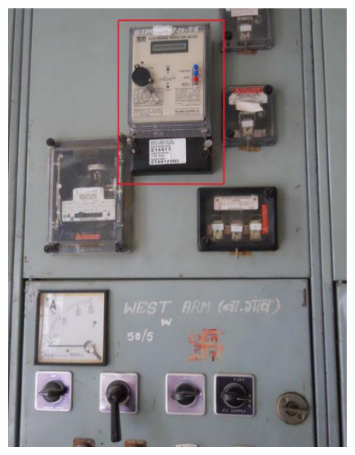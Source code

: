 \documentclass[a4paper,12pt]{article}
\begin{document}
\begin{figure}
\begin{center}
                                                                                                                                                                                                                                                                                                                                                                                                                                                                                                                                                                                                                                                                                                                                                                                                                                                                                                                                                                                                                                                                                                                                                                                                                                                                                                   \includegraphics[width=0.8\textwidth]{ElectricMeter.pdf}

\end{center}
\end{figure}
\end{document}
